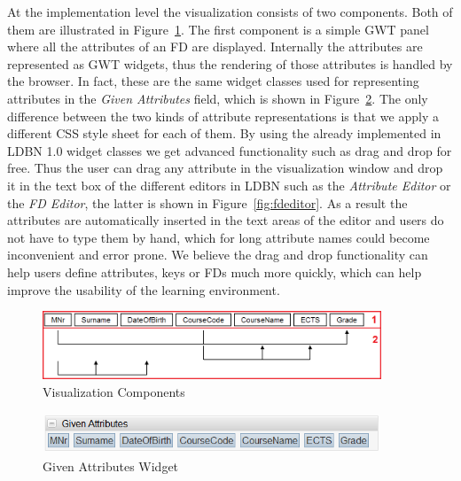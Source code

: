 At the implementation level the visualization consists of two components. 
Both of them are illustrated in Figure~\ref{fig:impl-fds01}.
The first component is a simple GWT panel where all the attributes of an FD are displayed. 
Internally the attributes are represented as GWT widgets, thus the rendering of those attributes is
handled by the browser. In fact, these are the same widget classes used for representing
attributes in the \emph{Given Attributes} field, which is shown in Figure~\ref{fig:given-atts}. 
The only difference between the two kinds of attribute representations is 
that we apply a different CSS style sheet for each of them. By using the already implemented in LDBN 1.0 
widget classes we get advanced functionality such as drag and drop for free. Thus the user
can drag any attribute in the visualization window and drop 
it in the text box of the different editors in LDBN
such as the \emph{Attribute Editor} or the \emph{FD Editor}, the latter is 
shown in Figure~\ref{fig:fdeditor}. 
As a result the
attributes are automatically inserted in the text areas of the editor and users do not have
to type them by hand, which for long attribute names could become inconvenient and error prone. 
We believe the drag and drop functionality can help
users define attributes, keys or FDs much more quickly, which can
help improve the usability of the learning environment.

\begin{figure}[ht]
	\begin{center}
		\includegraphics[width=0.9\textwidth]{./img/impl-fds01.png}
		\caption{Visualization Components}
		\label{fig:impl-fds01}
	\end{center}
\end{figure}

\begin{figure}[ht]
	\begin{center}
		\includegraphics[width=0.9\textwidth]{./img/given-atts.png}
		\caption{Given Attributes Widget}
		\label{fig:given-atts}
	\end{center}
\end{figure}

